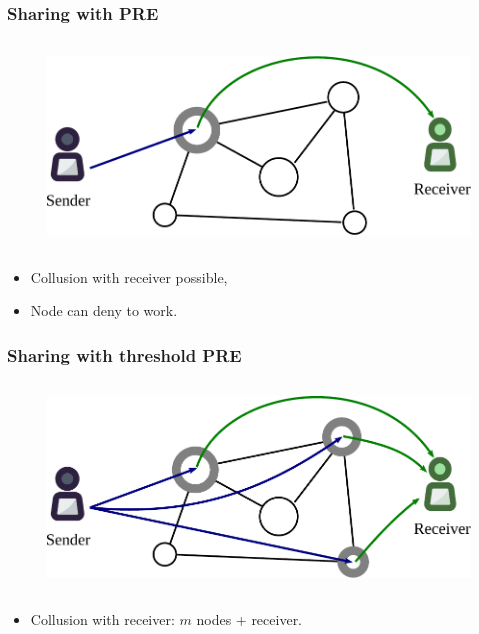 \documentclass[xetex,mathsans,sans,aspectratio=169]{beamer}
\begin{document}
    \begin{frame}
        \frametitle{Sharing with PRE}
        \begin{figure}
            \centering
            \includegraphics[height=5.5cm]{pdf/prenodes.pdf}
        \end{figure}
        \begin{itemize}
            \item Collusion with receiver possible,
            \item Node can deny to work.
        \end{itemize}
    \end{frame}

    \begin{frame}
        \frametitle{Sharing with threshold PRE}
        \begin{figure}
            \centering
            \includegraphics[height=5.5cm]{pdf/umbralnodes.pdf}
        \end{figure}
        \begin{itemize}
            \item Collusion with receiver: $m$ nodes + receiver.
        \end{itemize}
    \end{frame}
\end{document}
